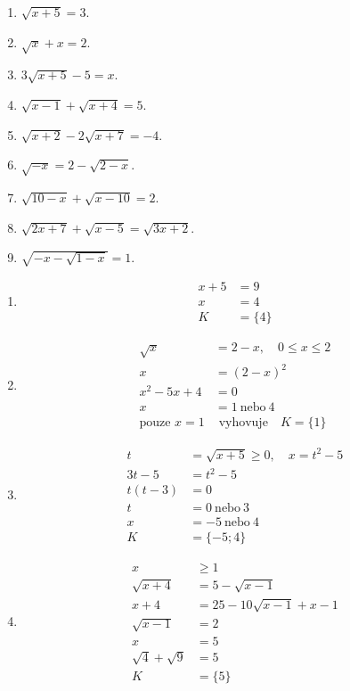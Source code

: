 \documentclass[11pt,a4paper]{article}
\begin{document}
\begin{zadaniReseniBox}[title={Domácí úkol}]
\begin{enumerate}[label=\alph*)]
\item $\sqrt{x+5}=3$.
\item $\sqrt x+x=2$.
\item $3\sqrt{x+5}-5=x$.
\item $\sqrt{x-1}+\sqrt{x+4}=5$.
\item $\sqrt{x+2}-2\sqrt{x+7}=-4$.
\item $\sqrt{-x}=2-\sqrt{2-x}$.
\item $\sqrt{10-x}+\sqrt{x-10}=2$.
\item $\sqrt{2x+7}+\sqrt{x-5}=\sqrt{3x+2}$.
\item $\sqrt{-x-\sqrt{1-x}}=1$.
\end{enumerate}
\tcblower
\begin{enumerate}[label=\alph*)]
\item \[\begin{aligned}x+5&=9\\x&=4\\K&=\{4\}\end{aligned}\]
\item \[\begin{aligned}\sqrt{x}&=2-x,\quad0\le x\le2\\x&=(2-x)^2\\x^2-5x+4&=0\\x&=1\ \text{nebo}\ 4\\\text{pouze }x=1&\text{ vyhovuje}\quad K=\{1\}\end{aligned}\]
\item \[\begin{aligned}t&=\sqrt{x+5}\ge0,\quad x=t^2-5\\3t-5&=t^2-5\\t(t-3)&=0\\t&=0\ \text{nebo}\ 3\\x&=-5\ \text{nebo}\ 4\\K&=\{-5;4\}\end{aligned}\]
\item \[\begin{aligned}x&\ge1\\\sqrt{x+4}&=5-\sqrt{x-1}\\x+4&=25-10\sqrt{x-1}+x-1\\\sqrt{x-1}&=2\\x&=5\\\sqrt4+\sqrt9&=5\\K&=\{5\}\end{aligned}\]

\end{enumerate}
\end{zadaniReseniBox}
\end{document}
